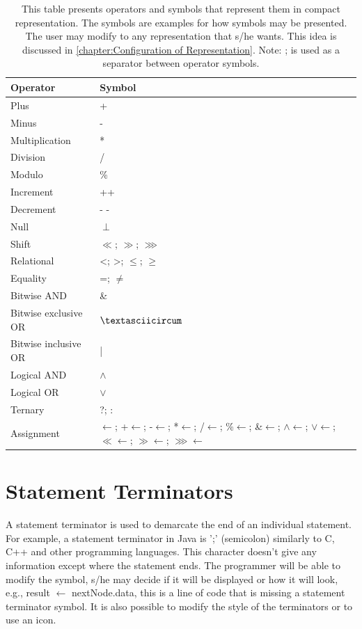 \begin{table}[H]
	\centering
	\begin{tabular}{|l|l|}
		\hline
		{\bf Operator} & {\bf Symbol} \\ \hline
		Plus & + \\ \hline
		Minus & - \\ \hline
		Multiplication & * \\ \hline
		Division & / \\ \hline
		Modulo & \% \\ \hline
		Increment & ++ \\ \hline
		Decrement & - - \\ \hline
		Null & $ \perp $ \\ \hline
		Shift & $ \ll $; $ \gg $; $ \ggg $ \\ \hline
		Relational & <; >; $ \leq $; $ \geq $ \\ \hline
		Equality & =; $ \neq $ \\ \hline
		Bitwise AND & \& \\ \hline
		Bitwise exclusive OR & $ \textasciicircum $ \\ \hline
		Bitwise inclusive OR & | \\ \hline
		Logical AND & $ \wedge $  \\ \hline
		Logical OR & $ \vee $  \\ \hline
		Ternary & ?; : \\ \hline
		Assignment & $ \longleftarrow $; +$ \longleftarrow $; -$ \longleftarrow $; *$ \longleftarrow $; /$ \longleftarrow $; \%$ \longleftarrow $; \&$ \longleftarrow $; $ \wedge $$ \longleftarrow $; $ \vee $$ \longleftarrow $; $ \ll $$ \longleftarrow $; $ \gg $$ \longleftarrow $; $ \ggg $$ \longleftarrow $\\ \hline
	\end{tabular}
	\caption{This table presents operators and symbols that represent them in compact representation. The symbols are examples for how symbols may be presented. The user may modify to any representation that s/he wants. This idea is discussed in \autoref{chapter:Configuration of Representation}. Note: ; is used as a separator between operator symbols.}
	\label{tab12}
\end{table}
\section{Statement Terminators}
A statement terminator is used to demarcate the end of an individual statement. For example, a statement terminator in Java is ';' (semicolon) similarly to C, C++ and other programming languages. This character doesn't give any information except where the statement ends. The programmer will be able to modify the symbol, s/he may decide if it will be displayed or how it will look, e.g., result $ \longleftarrow $ nextNode.data, this is a line of code that is missing a statement terminator symbol. It is also possible to modify the style of the terminators or to use an icon.
